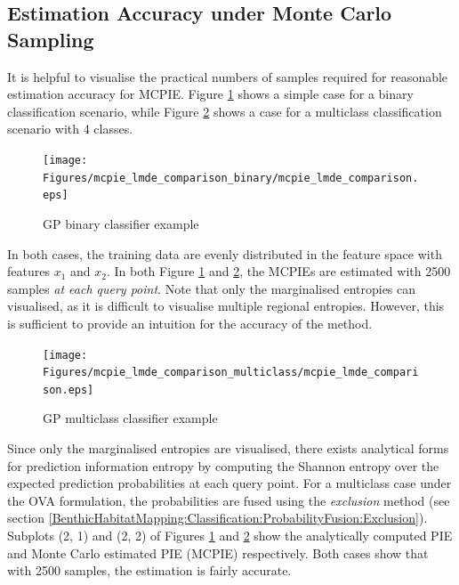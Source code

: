 		\subsection{Estimation Accuracy under Monte Carlo Sampling}
		\label{InformativeSeafloorExploration:ComparisonMutualEntropyMeasures:EstimationAccuracy}
		
			It is helpful to visualise the practical numbers of samples required for reasonable estimation accuracy for MCPIE. Figure \ref{Figure:mcpie_lmde_comparison_binary} shows a simple case for a binary classification scenario, while Figure \ref{Figure:mcpie_lmde_comparison_multiclass} shows a case for a multiclass classification scenario with 4 classes. 
			
			\begin{figure}[!htbp]
				\centering
					\texttt{[image: Figures/mcpie\_lmde\_comparison\_binary/mcpie\_lmde\_comparison.eps]}
				\caption{GP binary classifier example}
				\label{Figure:mcpie_lmde_comparison_binary}
			\end{figure}			
						
			In both cases, the training data are evenly distributed in the feature space with features $x_{1}$ and $x_{2}$. In both Figure \ref{Figure:mcpie_lmde_comparison_binary} and \ref{Figure:mcpie_lmde_comparison_multiclass}, the MCPIEs are estimated with 2500 samples \textit{at each query point}. Note that only the marginalised entropies can visualised, as it is difficult to visualise multiple regional entropies. However, this is sufficient to provide an intuition for the accuracy of the method.
			
			\begin{figure}[!htbp]
				\centering
					\texttt{[image: Figures/mcpie\_lmde\_comparison\_multiclass/mcpie\_lmde\_comparison.eps]}
				\caption{GP multiclass classifier example}
				\label{Figure:mcpie_lmde_comparison_multiclass}
			\end{figure}
			
			Since only the marginalised entropies are visualised, there exists analytical forms for prediction information entropy by computing the Shannon entropy over the expected prediction probabilities at each query point. For a multiclass case under the OVA formulation, the probabilities are fused using the \textit{exclusion} method (see section  \ref{BenthicHabitatMapping:Classification:ProbabilityFusion:Exclusion}). Subplots (2, 1) and (2, 2) of Figures \ref{Figure:mcpie_lmde_comparison_binary} and \ref{Figure:mcpie_lmde_comparison_multiclass} show the analytically computed PIE and Monte Carlo estimated PIE (MCPIE) respectively. Both cases show that with 2500 samples, the estimation is fairly accurate.
			
